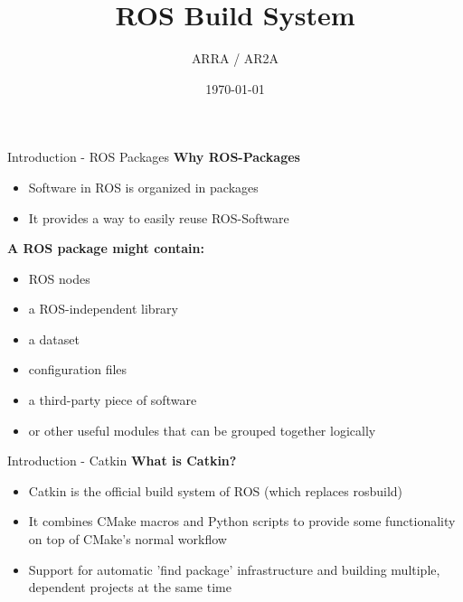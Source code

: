 \documentclass{beamer}
\title[]{ROS Build System} %
\author{ARRA / AR2A} %
\institute %
{
\textbf{A}dvancements for \textbf{R}obotics in \textbf{R}escue \textbf{A}pplications
}
\date{\today} %
\begin{document}
\begin{frame}
\titlepage
\end{frame}
\begin{frame}{Introduction -  ROS Packages}
 \textbf{Why ROS-Packages}
 \begin{itemize}
 \item Software in ROS is organized in packages
 \item It provides a way to easily reuse ROS-Software
 \end{itemize}
  \textbf{A ROS package might contain:}
 \begin{itemize}
 \item ROS nodes
 \item  a ROS-independent library
 \item a dataset
 \item configuration files
 \item a third-party piece of software
 \item or other useful modules that can be grouped together logically
 \end{itemize}
\end{frame}
\begin{frame}{Introduction -  Catkin}
 \textbf{What is Catkin?}
 \begin{itemize}
 \item Catkin is the official build system of ROS (which replaces rosbuild)
 \item It combines CMake macros and Python scripts to provide some functionality on top of CMake's normal workflow
 \item Support for automatic 'find package' infrastructure and building multiple, dependent projects at the same time
 \end{itemize}

\end{frame}
\end{document}
